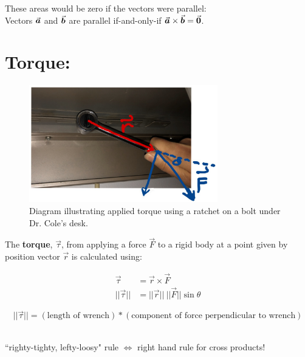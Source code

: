  These areas would be zero if the vectors were parallel:\\

 Vectors \(\a\) and \(\b\) are parallel if-and-only-if \(\a \times \b = \vec{0}\).\\


\vspace*{.1in}



\section*{Torque: }

\begin{figure}[!h]
\centering
\includegraphics[height=2in]{Ch2s4-torque3.png}
\caption{Diagram illustrating applied torque using a ratchet on a bolt under Dr. Cole's desk.}
\end{figure}


\hspace*{.2in}

The \textbf{torque}, \(\vec{\tau}\), from applying a force \(\vec{F}\) to a rigid body at a point given by position vector \(\vec{r}\) is  calculated using:

\begin{align*}
\vec{\tau} &= \vec{r} \times \vec{F} \\
||\vec{\tau}|| &= ||\vec{r}||\ ||\vec{F}|| \sin\theta
\end{align*}

\[ ||\vec{\tau}|| = (\text{length of wrench})*(\text{component of force perpendicular to wrench}) \]

~\\

 ``righty-tighty, lefty-loosy" rule \(\Leftrightarrow\) right hand rule for cross products!

